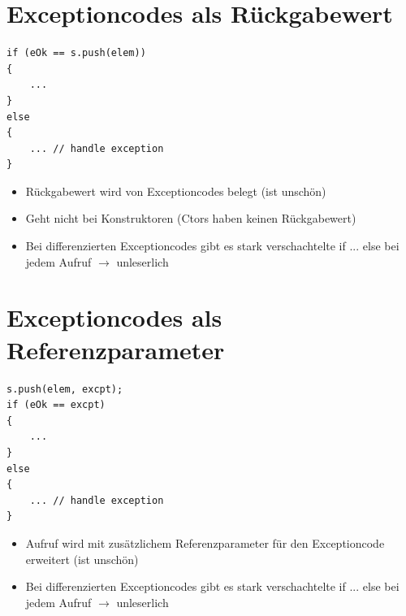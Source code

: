 \section{Exceptioncodes als Rückgabewert}
\begin{multicols}{2}
\begin{minipage}{\linewidth}
\vspace{-2\baselineskip}
\begin{lstlisting}
if (eOk == s.push(elem))
{
	...
}
else
{
	... // handle exception
}
\end{lstlisting}
\end{minipage}
\vfill\null
\columnbreak
\begin{itemize}
	\item Rückgabewert wird von Exceptioncodes belegt (ist unschön)
	\item Geht nicht bei Konstruktoren (Ctors haben keinen Rückgabewert)
	\item Bei differenzierten Exceptioncodes gibt es stark verschachtelte if ... else bei jedem Aufruf $\rightarrow$ unleserlich
\end{itemize}
\end{multicols}

\section{Exceptioncodes als Referenzparameter}
\begin{multicols}{2}
\begin{minipage}{\linewidth}
	\vspace{-2\baselineskip}
\begin{lstlisting}
s.push(elem, excpt);
if (eOk == excpt)
{
	...
}
else
{
	... // handle exception
}
\end{lstlisting}
\end{minipage}
\vfill\null
\columnbreak
\begin{itemize}
	\item Aufruf wird mit zusätzlichem Referenzparameter für den Exceptioncode erweitert (ist unschön)
	\item Bei differenzierten Exceptioncodes gibt es stark verschachtelte if ... else bei jedem Aufruf $\rightarrow$ unleserlich	
\end{itemize}
\end{multicols}
\vfill
\pagebreak\newpage

